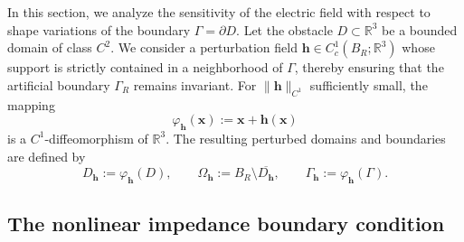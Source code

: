 \documentclass[10pt,a4paper]{amsart}
\numberwithin{equation}{section}
\begin{document}
In this section, we analyze the sensitivity of the electric field with respect to shape variations of the boundary $\Gamma = \partial D$. Let the obstacle $D \subset \mathbb{R}^3$ be a bounded domain of class $C^2$. We consider a perturbation field $\mathbf{h} \in C_c^1(B_R; \mathbb{R}^3)$ whose support is strictly contained in a neighborhood of $\Gamma$, thereby ensuring that the artificial boundary $\Gamma_R$ remains invariant. For $\|\mathbf{h}\|_{C^1}$ sufficiently small, the mapping
\[
\varphi_{\mathbf{h}}(\boldsymbol{x}) := \boldsymbol{x} + \mathbf{h}(\boldsymbol{x})
\]
is a $C^1$-diffeomorphism of $\mathbb{R}^3$. The resulting perturbed domains and boundaries are defined by
\[
D_{\mathbf{h}} := \varphi_{\mathbf{h}}(D), \qquad \Omega_{\mathbf{h}} := B_R \setminus \overline{D_{\mathbf{h}}}, \qquad \Gamma_{\mathbf{h}} := \varphi_{\mathbf{h}}(\Gamma).
\]

\subsection{The nonlinear impedance boundary condition}
\end{document}
